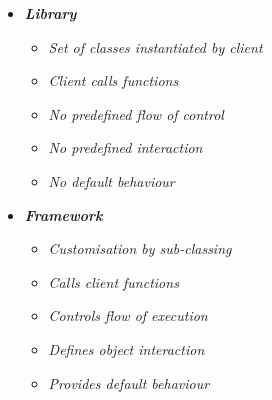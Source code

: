 		\vspace{-5mm}
		\begin{multicols}{2}
		
			\begin{itemize}		
				
				\item \textit{\textbf{Library}}	
				
					\begin{itemize}
			
						\item \textit{Set of classes instantiated by client}							
						\item \textit{Client calls functions}		
						\item \textit{No predefined flow of control}
						\item \textit{No predefined interaction}
						\item \textit{No default behaviour}						
					
					\end{itemize}
				

		\columnbreak
					
				\item \textit{\textbf{Framework}}	

					\begin{itemize}
			
						\item \textit{Customisation by sub-classing}							
						\item \textit{Calls client functions}	
						\item \textit{Controls flow of execution}							
						\item \textit{Defines object interaction}	
						\item \textit{Provides default behaviour}	
					
					\end{itemize}
					
			\end{itemize}

		\end{multicols}
		
